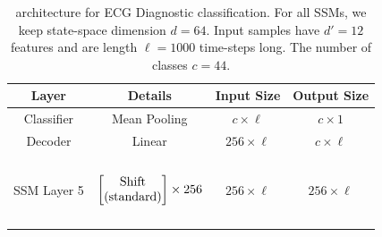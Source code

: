 \begin{table}[]
\centering
\caption{\ourmethod{} architecture for ECG Diagnostic classification. For all SSMs, we keep state-space dimension $d = 64$. Input samples have $d' = 12$ features and are length $\ell = 1000$ time-steps long. The number of classes $c = 44$.}
\label{tab:spacetime_ecg_diag}
\begin{tabular}{@{}c|c|c|c@{}}
Layer       & Details                                                                                                                                                                                                                                                                                                                 & Input Size        & Output Size       \\ \midrule
Classifier  & Mean Pooling                                                                                                                                                                                                                                                                                                            & $c \times \ell$   & $c \times 1$      \\ \midrule
Decoder     & Linear                                                                                                                                                                                                                                                                                                                  & $256 \times \ell$ & $c \times \ell$   \\ \midrule
SSM Layer 5 & \begin{math}\begin{aligned}    \begin{matrix}    \text{\phantom{-}} \\    \end{matrix}    \\    \begin{bmatrix}    \text{\phantom{-} Shift \phantom{-}} \\ \text{(standard)} \\    \end{bmatrix}    \times 256     \\    \begin{matrix}    \text{\phantom{-}} \\    \end{matrix}    \\\end{aligned}\end{math}              & $256 \times \ell$ & $256 \times \ell$ \\ \midrule

\end{tabular}
\end{table}
